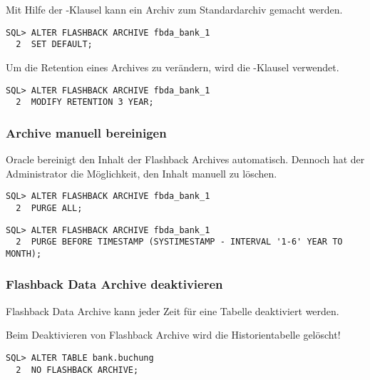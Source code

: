           Mit Hilfe der -Klausel kann ein Archiv zum Standardarchiv gemacht werden.
          \begin{lstlisting}[caption={Ein Archiv zum Standardarchiv machen},label=admin1738,language=oracle_sql]
SQL> ALTER FLASHBACK ARCHIVE fbda_bank_1
  2  SET DEFAULT;
          \end{lstlisting}
          Um die Retention eines Archives zu verändern, wird die -Klausel verwendet.
          \begin{lstlisting}[caption={Die Vorhaltedauer eines Archives verändern},label=admin1739,language=oracle_sql]
SQL> ALTER FLASHBACK ARCHIVE fbda_bank_1
  2  MODIFY RETENTION 3 YEAR;
          \end{lstlisting}
        \subsubsection{Archive manuell bereinigen}
          Oracle bereinigt den Inhalt der Flashback Archives automatisch. Dennoch hat der Administrator die Möglichkeit, den Inhalt manuell zu löschen.
          \begin{lstlisting}[caption={Den gesamten Inhalt eines Archives löschen},label=admin1740,language=oracle_sql]
SQL> ALTER FLASHBACK ARCHIVE fbda_bank_1
  2  PURGE ALL;
          \end{lstlisting}
          \begin{lstlisting}[caption={Alle Einträge löschen, die älter als ein Jahr und sechs Monate sind},label=admin1741,language=oracle_sql]
SQL> ALTER FLASHBACK ARCHIVE fbda_bank_1
  2  PURGE BEFORE TIMESTAMP (SYSTIMESTAMP - INTERVAL '1-6' YEAR TO MONTH);
          \end{lstlisting}
        \subsubsection{Flashback Data Archive deaktivieren}
          Flashback Data Archive kann jeder Zeit für eine Tabelle deaktiviert werden.
          \begin{merke}
            Beim Deaktivieren von Flashback Archive wird die Historientabelle gelöscht!
          \end{merke}
          \begin{lstlisting}[caption={Flashback Data Archive deaktivieren},label=admin1742,language=oracle_sql]
SQL> ALTER TABLE bank.buchung
  2  NO FLASHBACK ARCHIVE;
          \end{lstlisting}

